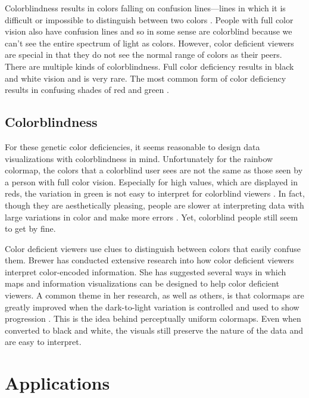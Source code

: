 \documentclass[journal]{IEEEtran}
\begin{document}
Colorblindness results in colors falling on confusion lines---lines in which it
is difficult or impossible to distinguish between two colors \cite{colormapping}. People with full
color vision also have confusion lines and so in some sense are colorblind because 
we can't see the entire spectrum of light as colors. However, color deficient viewers
are special in that they do not see the normal range of colors as their peers.
There are multiple kinds of colorblindness.
Full color deficiency results in black and white vision and is very rare.
The most common form of color deficiency results in confusing shades of red and green \cite{colorchoice}.

\subsection{Colorblindness}

For these genetic color deficiencies, it seems reasonable to design data
visualizations with colorblindness in mind. Unfortunately for the rainbow colormap,
the colors that a colorblind user sees are not the same as those seen by a person
with full color vision. Especially for high values, which are displayed in reds,
the variation in green is not easy to interpret for colorblind viewers \cite{cvimap}. In fact,
though they are aesthetically pleasing, people are slower at interpreting data with
large variations in color and make more errors \cite{arteryvis}. Yet, colorblind people still seem
to get by fine.

Color deficient viewers use clues to distinguish between colors that easily confuse them.
Brewer has conducted extensive research into how color deficient
viewers interpret color-encoded information. She has suggested several ways in which 
maps and information visualizations can be designed to help color deficient viewers.
A common theme in her research, as well as others, is that colormaps are greatly
improved when the dark-to-light variation is controlled and used to show progression \cite{cvimap}.
This is the idea behind perceptually uniform colormaps. Even when converted to black
and white, the visuals still preserve the nature of the data and are easy to interpret.



%

\section{Applications}
\end{document}
